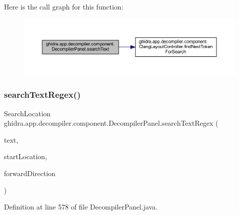 Here is the call graph for this function\+:
\nopagebreak
\begin{figure}[H]
\begin{center}
\leavevmode
\includegraphics[width=350pt]{classghidra_1_1app_1_1decompiler_1_1component_1_1_decompiler_panel_adec77ffde808184f39f911e173093426_cgraph}
\end{center}
\end{figure}
\mbox{\label{classghidra_1_1app_1_1decompiler_1_1component_1_1_decompiler_panel_a71b1d0c8a33c19608fb170244bfb96a3}} 
\subsubsection{\texorpdfstring{searchTextRegex()}{searchTextRegex()}}
{\footnotesize\ttfamily Search\+Location ghidra.\+app.\+decompiler.\+component.\+Decompiler\+Panel.\+search\+Text\+Regex (\begin{DoxyParamCaption}\item[{String}]{text,  }\item[{Field\+Location}]{start\+Location,  }\item[{boolean}]{forward\+Direction }\end{DoxyParamCaption})\hspace{0.3cm}{\ttfamily [inline]}}



Definition at line 578 of file Decompiler\+Panel.\+java.

